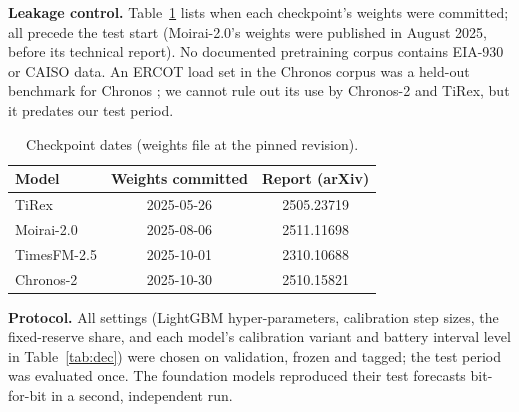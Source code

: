 \documentclass[conference]{IEEEtran}
\begin{document}
\textbf{Leakage control.} Table~\ref{tab:ckpt} lists when each checkpoint's weights were committed; all precede the test start (Moirai-2.0's weights were published in August 2025, before its technical report). No documented pretraining corpus contains EIA-930 or CAISO data. An ERCOT load set in the Chronos corpus was a held-out benchmark for Chronos \cite{ansari2024chronos}; we cannot rule out its use by Chronos-2 and TiRex, but it predates our test period.

\begin{table}[t]
\caption{Checkpoint dates (weights file at the pinned revision).}
\label{tab:ckpt}
\centering\footnotesize
\begin{tabular}{lcc}
\toprule
Model & Weights committed & Report (arXiv) \\
\midrule
TiRex & 2025-05-26 & 2505.23719 \\
Moirai-2.0 & 2025-08-06 & 2511.11698 \\
TimesFM-2.5 & 2025-10-01 & 2310.10688 \\
Chronos-2 & 2025-10-30 & 2510.15821 \\
\bottomrule
\end{tabular}
\end{table}

\textbf{Protocol.} All settings (LightGBM hyper-parameters, calibration step sizes, the fixed-reserve share, and each model's calibration variant and battery interval level in Table~\ref{tab:dec}) were chosen on validation, frozen and tagged; the test period was evaluated once. The foundation models reproduced their test forecasts bit-for-bit in a second, independent run.
\end{document}
